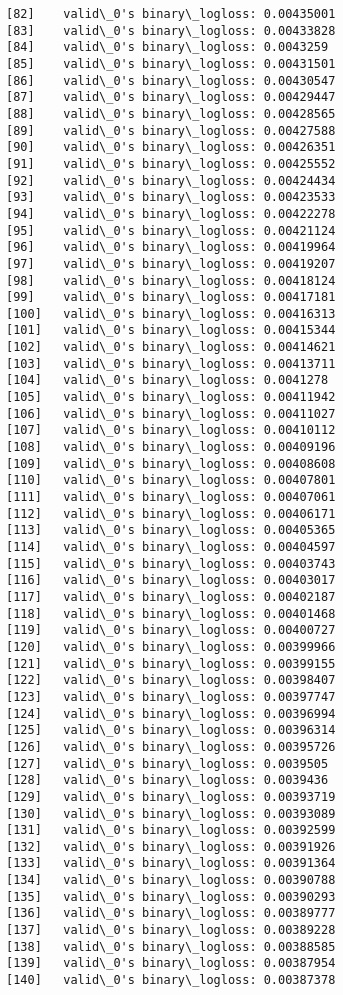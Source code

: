 \documentclass[11pt]{article}
\begin{document}
\begin{Verbatim}[commandchars=\\\{\}]
[82]	valid\_0's binary\_logloss: 0.00435001
[83]	valid\_0's binary\_logloss: 0.00433828
[84]	valid\_0's binary\_logloss: 0.0043259
[85]	valid\_0's binary\_logloss: 0.00431501
[86]	valid\_0's binary\_logloss: 0.00430547
[87]	valid\_0's binary\_logloss: 0.00429447
[88]	valid\_0's binary\_logloss: 0.00428565
[89]	valid\_0's binary\_logloss: 0.00427588
[90]	valid\_0's binary\_logloss: 0.00426351
[91]	valid\_0's binary\_logloss: 0.00425552
[92]	valid\_0's binary\_logloss: 0.00424434
[93]	valid\_0's binary\_logloss: 0.00423533
[94]	valid\_0's binary\_logloss: 0.00422278
[95]	valid\_0's binary\_logloss: 0.00421124
[96]	valid\_0's binary\_logloss: 0.00419964
[97]	valid\_0's binary\_logloss: 0.00419207
[98]	valid\_0's binary\_logloss: 0.00418124
[99]	valid\_0's binary\_logloss: 0.00417181
[100]	valid\_0's binary\_logloss: 0.00416313
[101]	valid\_0's binary\_logloss: 0.00415344
[102]	valid\_0's binary\_logloss: 0.00414621
[103]	valid\_0's binary\_logloss: 0.00413711
[104]	valid\_0's binary\_logloss: 0.0041278
[105]	valid\_0's binary\_logloss: 0.00411942
[106]	valid\_0's binary\_logloss: 0.00411027
[107]	valid\_0's binary\_logloss: 0.00410112
[108]	valid\_0's binary\_logloss: 0.00409196
[109]	valid\_0's binary\_logloss: 0.00408608
[110]	valid\_0's binary\_logloss: 0.00407801
[111]	valid\_0's binary\_logloss: 0.00407061
[112]	valid\_0's binary\_logloss: 0.00406171
[113]	valid\_0's binary\_logloss: 0.00405365
[114]	valid\_0's binary\_logloss: 0.00404597
[115]	valid\_0's binary\_logloss: 0.00403743
[116]	valid\_0's binary\_logloss: 0.00403017
[117]	valid\_0's binary\_logloss: 0.00402187
[118]	valid\_0's binary\_logloss: 0.00401468
[119]	valid\_0's binary\_logloss: 0.00400727
[120]	valid\_0's binary\_logloss: 0.00399966
[121]	valid\_0's binary\_logloss: 0.00399155
[122]	valid\_0's binary\_logloss: 0.00398407
[123]	valid\_0's binary\_logloss: 0.00397747
[124]	valid\_0's binary\_logloss: 0.00396994
[125]	valid\_0's binary\_logloss: 0.00396314
[126]	valid\_0's binary\_logloss: 0.00395726
[127]	valid\_0's binary\_logloss: 0.0039505
[128]	valid\_0's binary\_logloss: 0.0039436
[129]	valid\_0's binary\_logloss: 0.00393719
[130]	valid\_0's binary\_logloss: 0.00393089
[131]	valid\_0's binary\_logloss: 0.00392599
[132]	valid\_0's binary\_logloss: 0.00391926
[133]	valid\_0's binary\_logloss: 0.00391364
[134]	valid\_0's binary\_logloss: 0.00390788
[135]	valid\_0's binary\_logloss: 0.00390293
[136]	valid\_0's binary\_logloss: 0.00389777
[137]	valid\_0's binary\_logloss: 0.00389228
[138]	valid\_0's binary\_logloss: 0.00388585
[139]	valid\_0's binary\_logloss: 0.00387954
[140]	valid\_0's binary\_logloss: 0.00387378

\end{Verbatim}
\end{document}
